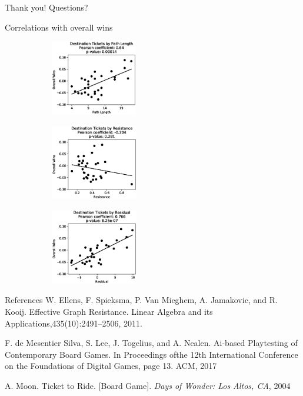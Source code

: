 \documentclass[12pt]{beamer}
\begin{document}
\begin{frame}{Thank you!}
    Questions?
\end{frame}

\begin{frame}{Correlations with overall wins}
   \begin{figure}
    \centering
    \begin{subfigure}
        \centering
        \includegraphics[height=1.3in]{figures/correlation0}
    \end{subfigure}
    \begin{subfigure}
        \centering
        \includegraphics[height=1.3in]{figures/correlation1}
    \end{subfigure}
    \begin{subfigure}
        \centering
        \includegraphics[height=1.3in]{figures/correlation2}
    \end{subfigure}
    \end{figure} 
\end{frame}

\begin{frame}{References}
    W. Ellens, F. Spieksma, P. Van Mieghem, 
    A. Jamakovic, and R. Kooij.
    Effective Graph Resistance. Linear Algebra and
    its Applications,435(10):2491–2506, 2011.
    
    \vspace{.5cm}
    F. de Mesentier Silva, S. Lee, J. Togelius, and A. Nealen.
    Ai-based Playtesting of Contemporary Board Games.
    In Proceedings ofthe 12th International Conference on the
    Foundations of Digital Games, page 13.  ACM, 2017
    
    \vspace{.5cm}   
    A. Moon.
    Ticket to Ride. [Board Game].
    \textit{Days of Wonder: Los Altos, CA}, 2004
\end{frame}
\end{document}
